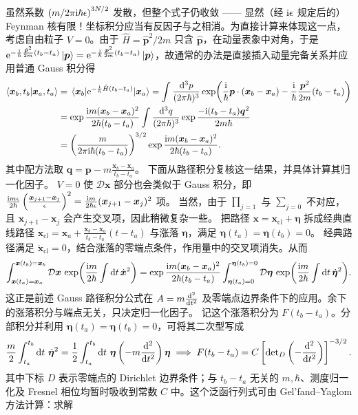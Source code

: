 虽然系数 $\left({m}/{2\pi\mathrm{i}\hbar\epsilon}\right)^{3N/2}$ 发散，但整个式子仍收敛 —— 显然（经 $\mathrm{i}\epsilon$ 规定后的）Feynman 核有限！坐标积分应当有反因子与之相消。为直接计算来体现这一点，考虑自由粒子 $V=0$。由于 $\hat H=\hat{\bm p}^2/2m$ 只含 $\hat{\bm p}$，在动量表象中对角，于是 $\mathrm{e}^{-\frac{\mathrm{i}}{\hbar}\frac{\hat{\bm p}^2}{2m} (t_b-t_a)}\ket{\bm p}=\mathrm{e}^{-\frac{\mathrm{i}}{\hbar}\frac{{\bm p}^2}{2m} (t_b-t_a)}\ket{\bm p}$，故通常的办法是直接插入动量完备关系并应用普通 Gauss 积分得
\begin{align*}
\ip{\bm x_b,t_b}{\bm x_a,t_a}&=\mel{\bm x_b}{\e^{-\frac{\i}{\hbar}\hat H (t_b-t_a)}}{\bm x_a}=
\int \frac{\dd[3]{p}}{(2\pi\hbar)^3}
\exp(
\frac{\i}{\hbar}\bm p\cdot(\bm x_b-\bm x_a)
-\frac{\i}{\hbar}\frac{\bm p^2}{2m}(t_b-t_a))\\
&=\exp\frac{\i m(\bm x_b-\bm x_a)^2}{2\hbar (t_b-t_a)}
\int \frac{\dd[3]{q}}{(2\pi\hbar)^3}
\exp\frac{-\i(t_b-t_a)\bm q^2}{2m\hbar}\\
&=\left(\frac{m}{2\pi\i\hbar (t_b-t_a)}\right)^{3/2}
    \exp\frac{\i m(\bm x_b-\bm x_a)^2}{2\hbar (t_b-t_a)}.
\end{align*}
其中配方法取 $\bm q=\bm p-m\frac{\bm x_b-\bm x_a}{t_b-t_a}$。
下面从路径积分复核这一结果，并具体计算其归一化因子。
$V=0$ 使 $\mathcal D\bm x$ 部分也会类似于 Gauss 积分，即 $\frac{\mathrm{i} m\epsilon}{2\hbar}\left(\frac{\bm x_{j+1}-\bm x_j}{\epsilon}\right)^2=\frac{\mathrm{i} m}{2\hbar\epsilon}(\bm x_{j+1}-\bm x_j)^2$ 项。
当然，由于 $\prod_{j=1}$ 与 $\sum_{j=0}$ 不对应，且 $\bm x_{j+1}-\bm x_j$ 会产生交叉项，因此稍微复杂一些。
把路径 $\bm x=\bm x_\mathrm{cl}+\bm\eta$ 拆成经典直线路径 $\bm x_\mathrm{cl}=\bm x_a+\frac{\bm x_b-\bm x_a}{t_b-t_a}(t-t_a)$ 与涨落 $\bm\eta$，满足 $\bm\eta(t_a)=\bm\eta(t_b)=0$。
经典路径满足 $\ddot{\bm x}_\mathrm{cl}=0$，结合涨落的零端点条件，作用量中的交叉项消失。从而
\[
    \int_{\bm x(t_a)=\bm x_a}^{\bm x(t_b)=\bm x_b}
    \mathcal D\bm x\,
    \exp(\frac{\mathrm{i} m}{2\hbar}\int\dd{t}\dot{\bm x}^2)=\exp\frac{\mathrm{i} m(\bm x_b-\bm x_a)^2}{2\hbar(t_b-t_a)}
    \int_{\bm\eta(t_a)=0}^{\bm\eta(t_b)=0}
    \mathcal D\bm\eta\,
    \exp(\frac{\mathrm{i} m}{2\hbar}\int\dd{t}\dot{\bm\eta}^2).
\]
这正是前述 Gauss 路径积分公式在 $A=m\dv[2]{}{t}$ 及零端点边界条件下的应用。余下的涨落积分与端点无关，只决定归一化因子。
记这个涨落积分为 $F(t_b-t_a)$。分部积分并利用 $\bm\eta(t_a)=\bm\eta(t_b)=0$，可将其二次型写成
\[
    \frac{m}{2}\int_{t_a}^{t_b}\dd{t}\,\dot{\bm\eta}^2
    =\frac{1}{2}\int_{t_a}^{t_b}\dd{t}\,
    \bm\eta\left(-m\dv[2]{}{t}\right)\bm\eta\implies F(t_b-t_a)=C\left[\det\nolimits_D
    \left(-\dv[2]{}{t}\right)\right]^{-3/2}.
\]
其中下标 $D$ 表示零端点的 Dirichlet 边界条件；与 $t_b-t_a$ 无关的 $m,\hbar$、测度归一化及 Fresnel 相位均暂时吸收到常数 $C$ 中。这个泛函行列式可由 Gel'fand--Yaglom 方法计算：求解
